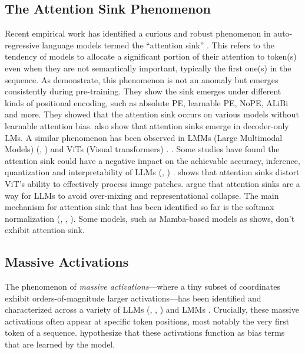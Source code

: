 \documentclass[11pt]{article}
\newif\ifYRMcomments
\newcommand{\YRM}[1]{\ifYRMcomments\textcolor{red}{[YRM: #1]}\fi}
\begin{document}
\subsection{The Attention Sink Phenomenon}
Recent empirical work has identified a curious and robust phenomenon in auto-regressive language models termed the ``attention sink'' \citep{xiao2023efficient}. This refers to the tendency of models to allocate a significant portion of their attention to token(s) even when they are not semantically important, typically the first one(s) in the sequence. As \citet{gu2025when} demonstrate, this phenomenon is not an anomaly but emerges consistently during pre-training. They show the sink emerges under different kinds of positional encoding, such as absolute PE, learnable PE, NoPE, ALiBi and more. They showed that the attention sink occurs on various models without learnable attention bias. \citet{xiao2023efficient} also show that attention sinks emerge in decoder-only LMs. A similar phenomenon has been observed in LMMs (Large Multimodal Models) (\citet{Kang2025See}, \cite{wang2025mirage}) and ViTs (Visual transformers) \cite{Feng2025EDIT:}. \YRM{This is possibly the most important part of the RW. This should be with much more details and more citations, so saying specially that he demonstrated this in model without query bias and absolute positional encoding}. Some studies have found the attention sink could have a negative impact on the achievable accuracy, inference, quantization and interpretability of LLMs (\citet{Yu2024Unveiling}, \citet{Guo2024ActiveDormantAH}) \YRM{Can you add a bit more details here? how does it hurt inference/quantization and interpretability?}.  \citet{Feng2025EDIT:} shows that attention sinks distort ViT's ability to effectively process image patches. \citet {Barbero2025Why} argue that attention sinks are a way for LLMs to avoid over-mixing and representational collapse. The main mechanism for attention sink that has been identified so far is the softmax normalization (\citet{xiao2023efficient}, \citet{gu2025when}, \citet{Zuhri2025SoftpickNA}). Some models, such as Mamba-based models as \citet{endy-etal-2025-mamba} shows, don't exhibit attention sink.

\subsection{Massive Activations}
The phenomenon of \emph{massive activations}—where a tiny subset of coordinates exhibit orders-of-magnitude larger activations—has been identified and characterized across a variety of LLMs (\citet{sun2024massive}, \citet{lindnielsen2024spectral}, \citet{lin2024duquant}) and LMMs \cite{Kang2025See}. Crucially, these massive activations often appear at specific token positions, most notably the very first token of a sequence. \citep{sun2024massive} hypothesize that these activations function as bias terms that are learned by the model. 
\end{document}
